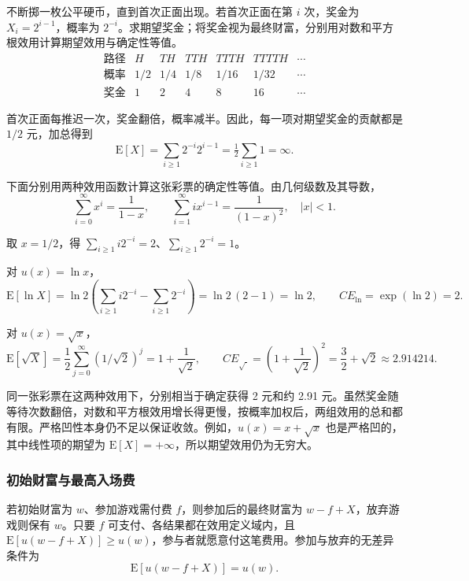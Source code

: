 \begin{tcolorbox}[example,title=课堂例题：圣彼得堡彩票]
\begin{question}
不断掷一枚公平硬币，直到首次正面出现。若首次正面在第 $i$ 次，奖金为 $X_i=2^{i-1}$，概率为 $2^{-i}$。求期望奖金；将奖金视为最终财富，分别用对数和平方根效用计算期望效用与确定性等值。
\[
\begin{array}{c|cccccc}
 \text{路径}&H&TH&TTH&TTTH&TTTTH&\cdots\\\hline
 \text{概率}&1/2&1/4&1/8&1/16&1/32&\cdots\\
 \text{奖金}&1&2&4&8&16&\cdots
\end{array}
\]
\end{question}
\begin{solution}[blank-type=manual,blank-vsep=6\baselineskip]
首次正面每推迟一次，奖金翻倍，概率减半。因此，每一项对期望奖金的贡献都是 $1/2$ 元，加总得到
\[
 \mathrm E[X]=\sum_{i\ge1}2^{-i}2^{i-1}=\tfrac12\sum_{i\ge1}1=\infty.
\]

下面分别用两种效用函数计算这张彩票的确定性等值。由几何级数及其导数，
\[
 \sum_{i=0}^{\infty}x^i=\frac1{1-x},\qquad
 \sum_{i=1}^{\infty}ix^{i-1}=\frac1{(1-x)^2},\quad |x|<1.
\]

取 $x=1/2$，得 $\sum_{i\ge1}i2^{-i}=2$、$\sum_{i\ge1}2^{-i}=1$。

对 $u(x)=\ln x$，
\[
 \mathrm E[\ln X]
 =\ln 2\left(\sum_{i\ge1}i2^{-i}-\sum_{i\ge1}2^{-i}\right)
 =\ln 2\,(2-1)=\ln 2,
 \qquad CE_{\ln}=\exp(\ln 2)=2.
\]

对 $u(x)=\sqrt x$，
\[
 \mathrm E[\sqrt X]=\frac12\sum_{j=0}^{\infty}(1/\sqrt2)^j
 =1+\frac1{\sqrt2},\qquad
 CE_{\sqrt{\cdot}}=\left(1+\frac1{\sqrt2}\right)^2
 =\frac32+\sqrt2\approx2.914214.
\]

同一张彩票在这两种效用下，分别相当于确定获得 2 元和约 2.91 元。虽然奖金随等待次数翻倍，对数和平方根效用增长得更慢，按概率加权后，两组效用的总和都有限。严格凹性本身仍不足以保证收敛。例如，$u(x)=x+\sqrt{x}$ 也是严格凹的，其中线性项的期望为 $\mathrm E[X]=+\infty$，所以期望效用仍为无穷大。
\end{solution}
\end{tcolorbox}

\subsubsection{初始财富与最高入场费}
若初始财富为 $w$、参加游戏需付费 $f$，则参加后的最终财富为 $w-f+X$，放弃游戏则保有 $w$。只要 $f$ 可支付、各结果都在效用定义域内，且 $\mathrm E[u(w-f+X)]\ge u(w)$，参与者就愿意付这笔费用。参加与放弃的无差异条件为
\[
 \mathrm E[u(w-f+X)]=u(w).
\]

